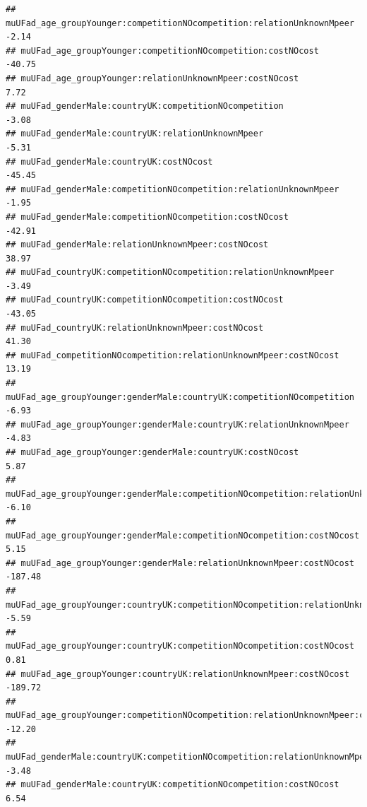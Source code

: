 \documentclass[
]{article}
\begin{document}
\begin{verbatim}
## muUFad_age_groupYounger:competitionNOcompetition:relationUnknownMpeer                           -2.14
## muUFad_age_groupYounger:competitionNOcompetition:costNOcost                                    -40.75
## muUFad_age_groupYounger:relationUnknownMpeer:costNOcost                                          7.72
## muUFad_genderMale:countryUK:competitionNOcompetition                                            -3.08
## muUFad_genderMale:countryUK:relationUnknownMpeer                                                -5.31
## muUFad_genderMale:countryUK:costNOcost                                                         -45.45
## muUFad_genderMale:competitionNOcompetition:relationUnknownMpeer                                 -1.95
## muUFad_genderMale:competitionNOcompetition:costNOcost                                          -42.91
## muUFad_genderMale:relationUnknownMpeer:costNOcost                                               38.97
## muUFad_countryUK:competitionNOcompetition:relationUnknownMpeer                                  -3.49
## muUFad_countryUK:competitionNOcompetition:costNOcost                                           -43.05
## muUFad_countryUK:relationUnknownMpeer:costNOcost                                                41.30
## muUFad_competitionNOcompetition:relationUnknownMpeer:costNOcost                                 13.19
## muUFad_age_groupYounger:genderMale:countryUK:competitionNOcompetition                           -6.93
## muUFad_age_groupYounger:genderMale:countryUK:relationUnknownMpeer                               -4.83
## muUFad_age_groupYounger:genderMale:countryUK:costNOcost                                          5.87
## muUFad_age_groupYounger:genderMale:competitionNOcompetition:relationUnknownMpeer                -6.10
## muUFad_age_groupYounger:genderMale:competitionNOcompetition:costNOcost                           5.15
## muUFad_age_groupYounger:genderMale:relationUnknownMpeer:costNOcost                            -187.48
## muUFad_age_groupYounger:countryUK:competitionNOcompetition:relationUnknownMpeer                 -5.59
## muUFad_age_groupYounger:countryUK:competitionNOcompetition:costNOcost                            0.81
## muUFad_age_groupYounger:countryUK:relationUnknownMpeer:costNOcost                             -189.72
## muUFad_age_groupYounger:competitionNOcompetition:relationUnknownMpeer:costNOcost               -12.20
## muUFad_genderMale:countryUK:competitionNOcompetition:relationUnknownMpeer                       -3.48
## muUFad_genderMale:countryUK:competitionNOcompetition:costNOcost                                  6.54

\end{verbatim}
\end{document}
